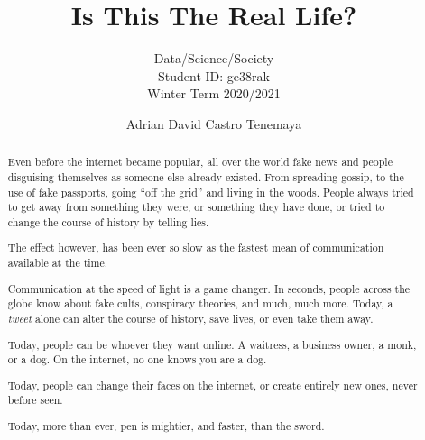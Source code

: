 \documentclass[sigconf,nonacm]{acmart}
\begin{document}
\title{Is This The Real Life?}
\subtitle{Data/Science/Society \\ Student ID: ge38rak \\ Winter Term 2020/2021}

\author{Adrian David Castro Tenemaya}

\begin{abstract}
  Even before the internet became popular, all over the world fake news and people disguising themselves as someone else already existed. From spreading gossip, to the use of fake passports, going ``off the grid'' and living in the woods. People always tried to get away from something they were, or something they have done, or tried to change the course of history by telling lies.

  The effect however, has been ever so slow as the fastest mean of communication available at the time.

  Communication at the speed of light is a game changer. In seconds, people across the globe know about fake cults, conspiracy theories, and much, much more.
  Today, a \textit{tweet} alone can alter the course of history, save lives, or even take them away.

  Today, people can be whoever they want online. A waitress, a business owner, a monk, or a dog. On the internet, no one knows you are a dog.

  Today, people can change their faces on the internet, or create entirely new ones, never before seen.

  Today, more than ever, pen is mightier, and faster, than the sword.
\end{abstract}

\maketitle











\end{document}
